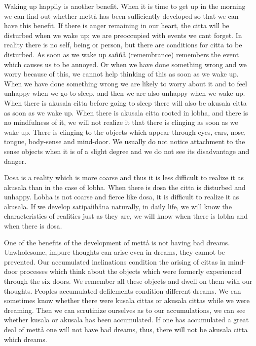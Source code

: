 \documentclass[12pt,twoside]{article}
\begin{document}
Waking up happily is another benefit. When it is time to get up in the
morning we can find out whether mett{\aa} has been sufficiently
developed so that we can have this benefit. If there is anger remaining
in our heart, the citta will be disturbed when we wake up; we are
preoccupied with events we can{\textquotesingle}t forget. In reality
there is no self, being or person, but there are conditions for citta
to be disturbed. As soon as we wake up sa\~n\~n{\aa} (remembrance)
remembers the event which causes us to be annoyed. Or when we have done
something wrong and we worry because of this, we cannot help thinking
of this as soon as we wake up. When we have done something wrong we are
likely to worry about it and to feel unhappy when we go to sleep, and
then we are also unhappy when we wake up. When there is akusala citta
before going to sleep there will also be akusala citta as soon as we
wake up. When there is akusala citta rooted in lobha, and there is no
mindfulness of it, we will not realize it that there is clinging as
soon as we wake up. There is clinging to the objects which appear
through eyes, ears, nose, tongue, body{}-sense and mind{}-door. We
usually do not notice attachment to the sense objects when it is of a
slight degree and we do not see its disadvantage and danger. 

Dosa is a reality which is more coarse and thus it is less difficult to
realize it as akusala than in the case of lobha. When there is dosa the
citta is disturbed and unhappy. Lobha is not coarse and fierce like
dosa, it is difficult to realize it as akusala. If we develop
satipa\`i\`ih{\aa}na naturally, in daily life, we will know the
characteristics of realities just as they are, we will know when there
is lobha and when there is dosa. 

One of the benefits of the development of mett{\aa} is not having bad
dreams. Unwholesome, impure thoughts can arise even in dreams, they
cannot be prevented. Our accumulated inclinations condition the arising
of cittas in mind{}-door processes which think about the objects which
were formerly experienced through the six doors. We remember all these
objects and dwell on them with our thoughts. People{\textquotesingle}s
accumulated defilements condition different dreams. We can sometimes
know whether there were kusala cittas or akusala cittas while we were
dreaming. Then we can scrutinize ourselves as to our accumulations, we
can see whether kusala or akusala has been accumulated. If one has
accumulated a great deal of mett{\aa} one will not have bad dreams,
thus, there will not be akusala citta which dreams. 
\end{document}
